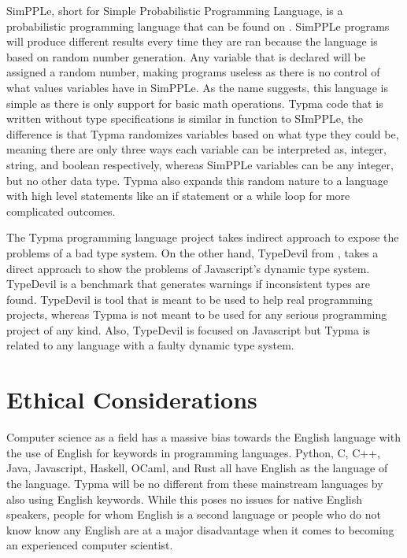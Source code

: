 \documentclass[10pt,twocolumn]{article}
\begin{document}
SimPPLe, short for Simple Probabilistic Programming Language, is a probabilistic programming language that can be found on \textcite{SimPPLe}. SimPPLe programs will produce different results every time they are ran because the language is based on random number generation. Any variable that is declared will be assigned a random number, making programs useless as there is no control of what values variables have in SimPPLe. As the name suggests, this language is simple as there is only support for basic math operations. Typma code that is written without type specifications is similar in function to SImPPLe, the difference is that Typma randomizes variables based on what type they could be, meaning there are only three ways each variable can be interpreted as, integer, string, and boolean respectively, whereas SimPPLe variables can be any integer, but no other data type. Typma also expands this random nature to a language with high level statements like an if statement or a while loop for more complicated outcomes.

The Typma programming language project takes indirect approach to expose the problems of a bad type system. On the other hand, TypeDevil from \textcite{Pradel2014TypeDevil}, takes a direct approach to show the problems of Javascript's dynamic type system. TypeDevil is a benchmark that generates warnings if inconsistent types are found. TypeDevil is tool that is meant to be used to help real programming projects, whereas Typma is not meant to be used for any serious programming project of any kind. Also, TypeDevil is focused on Javascript but Typma is related to any language with a faulty dynamic type system. 

\section{Ethical Considerations}

Computer science as a field has a massive bias towards the English language with the use of English for keywords in programming languages. Python, C, C++, Java, Javascript, Haskell, OCaml, and Rust all have English as the language of the language. Typma will be no different from these mainstream languages by also using English keywords. While this poses no issues for native English speakers, people for whom English is a second language or people who do not know know any English are at a major disadvantage when it comes to becoming an experienced computer scientist. 
\end{document}
